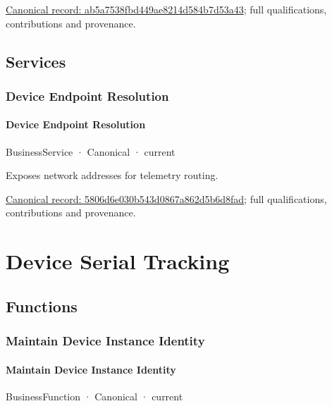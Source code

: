 {\footnotesize \href{../../../../continuum/business/business-function/ab5a7538fbd449ae8214d584b7d53a43.md}{Canonical record: ab5a7538fbd449ae8214d584b7d53a43}; full qualifications, contributions and provenance.}\par
\subsection{Services}

\subsubsection{Device Endpoint Resolution}

\paragraph{Device Endpoint Resolution}

\label{element:5806d6e030b543d0867a862d5b6d8fad}
{\small BusinessService · Canonical · current}\par

Exposes network addresses for telemetry routing.


{\footnotesize \href{../../../../continuum/business/business-service/5806d6e030b543d0867a862d5b6d8fad.md}{Canonical record: 5806d6e030b543d0867a862d5b6d8fad}; full qualifications, contributions and provenance.}\par
\section{Device Serial Tracking}

\subsection{Functions}

\subsubsection{Maintain Device Instance Identity}

\paragraph{Maintain Device Instance Identity}

\label{element:927796d77f5e4f61835bd2a7bcceb681}
{\small BusinessFunction · Canonical · current}\par

